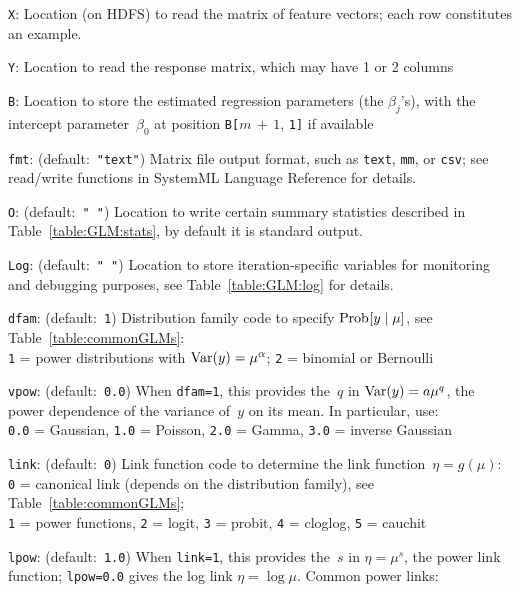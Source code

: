 \smallskip
{}
\begin{Description}
\item[{\tt X}:]
Location (on HDFS) to read the matrix of feature vectors; each row constitutes
an example.
\item[{\tt Y}:]
Location to read the response matrix, which may have 1 or 2 columns
\item[{\tt B}:]
Location to store the estimated regression parameters (the $\beta_j$'s), with the
intercept parameter~$\beta_0$ at position {\tt B[}$m\,{+}\,1$, {\tt 1]} if available
\item[{\tt fmt}:] (default:\mbox{ }{\tt "text"})
Matrix file output format, such as {\tt text}, {\tt mm}, or {\tt csv};
see read/write functions in SystemML Language Reference for details.
\item[{\tt O}:] (default:\mbox{ }{\tt " "})
Location to write certain summary statistics described in Table~\ref{table:GLM:stats},
by default it is standard output.
\item[{\tt Log}:] (default:\mbox{ }{\tt " "})
Location to store iteration-specific variables for monitoring and debugging purposes,
see Table~\ref{table:GLM:log} for details.
\item[{\tt dfam}:] (default:\mbox{ }{\tt 1})
Distribution family code to specify $\mathop{\mathrm{Prob}\hspace{0.5pt}}\nolimits[y\mid \mu]$, see Table~\ref{table:commonGLMs}:\\
{\tt 1} = power distributions with $\mathop{\mathrm{Var}}\nolimits(y) = \mu^{\alpha}$;
{\tt 2} = binomial or Bernoulli
\item[{\tt vpow}:] (default:\mbox{ }{\tt 0.0})
When {\tt dfam=1}, this provides the~$q$ in $\mathop{\mathrm{Var}}\nolimits(y) = a\mu^q$, the power
dependence of the variance of~$y$ on its mean.  In particular, use:\\
{\tt 0.0} = Gaussian,
{\tt 1.0} = Poisson,
{\tt 2.0} = Gamma,
{\tt 3.0} = inverse Gaussian
\item[{\tt link}:] (default:\mbox{ }{\tt 0})
Link function code to determine the link function~$\eta = g(\mu)$:\\
{\tt 0} = canonical link (depends on the distribution family), see Table~\ref{table:commonGLMs};\\
{\tt 1} = power functions,
{\tt 2} = logit,
{\tt 3} = probit,
{\tt 4} = cloglog,
{\tt 5} = cauchit
\item[{\tt lpow}:] (default:\mbox{ }{\tt 1.0})
When {\tt link=1}, this provides the~$s$ in $\eta = \mu^s$, the power link
function; {\tt lpow=0.0} gives the log link $\eta = \log\mu$.  Common power links:\\

\end{Description}
